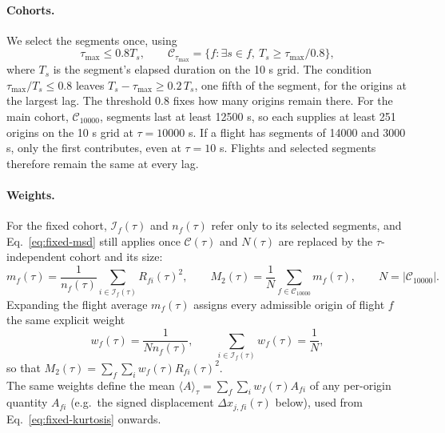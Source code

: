 \paragraph{Cohorts.}
We select the segments once, using
\begin{equation}
 \tau_{\max}\leq0.8T_s,\qquad
 \mathcal C_{\tau_{\max}}=\{f:\exists s\in f,\ T_s\geq\tau_{\max}/0.8\},
 \label{eq:fixed-support}
\end{equation}
where $T_s$ is the segment's elapsed duration on the 10 s grid. The condition
$\tau_{\max}/T_s\leq0.8$ leaves $T_s-\tau_{\max}\geq0.2\,T_s$, one fifth of the
segment, for the origins at the largest lag. The threshold 0.8 fixes how many origins
remain there. For the main cohort, $\mathcal C_{10000}$, segments last at least
12500 s, so each supplies at least 251 origins on the 10 s grid at $\tau=10000$ s.
If a flight has segments of
14000 and 3000 s, only the first contributes, even at $\tau=10$ s. Flights and
selected segments therefore remain the same at every lag.

\paragraph{Weights.}
For the fixed cohort, $\mathcal I_f(\tau)$ and $n_f(\tau)$ refer only to its selected
segments, and Eq.~\eqref{eq:fixed-msd} still applies once $\mathcal C(\tau)$ and
$N(\tau)$ are replaced by the $\tau$-independent cohort and its size:
\begin{equation}
 m_f(\tau)=\frac1{n_f(\tau)}\sum_{i\in\mathcal I_f(\tau)}R_{fi}(\tau)^2,\qquad
 M_2(\tau)=\frac1N\sum_{f\in\mathcal C_{10000}}m_f(\tau),\qquad N=|\mathcal C_{10000}|.
 \label{eq:fixed-cohort-msd}
\end{equation}
Expanding the flight average $m_f(\tau)$ assigns every admissible origin of flight $f$
the same explicit weight
\begin{equation}
 w_f(\tau)=\frac{1}{Nn_f(\tau)},\qquad
 \sum_{i\in\mathcal I_f(\tau)}w_f(\tau)=\frac1N,
 \label{eq:fixed-weights}
\end{equation}
so that $M_2(\tau)=\sum_f\sum_{i}w_f(\tau)R_{fi}(\tau)^2$.\\
The same weights define the mean $\langle A\rangle_\tau=\sum_f\sum_{i}w_f(\tau)A_{fi}$ of any
per-origin quantity $A_{fi}$ (e.g.\ the signed displacement $\Delta x_{j,fi}(\tau)$
below), used from Eq.~\eqref{eq:fixed-kurtosis} onwards.

\begin{table}[htbp]
 \centering\small
 
 \caption{Nested duration cohorts and their site--day groups, the resampling
 units of Sec.~\ref{sec:fixed-general}. The nominal minimum durations
 $\tau_{\max}/0.8$ are 125, 1250 and 12500 s; since $T_s$ only takes multiples of
 10 s, the effective cutoffs are 130, 1250 and 12500 s.}
 \label{tab:fixed-cohorts}
\end{table}

